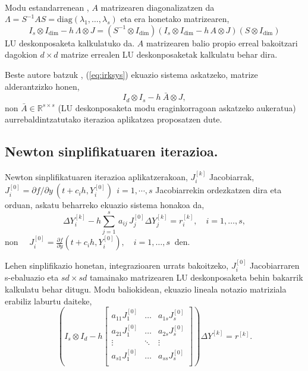 \paragraph*{}Modu estandarrenean  \cite{Butcher1976} \cite{Liniger1970} \cite{Bickart1977} , $A$ matrizearen diagonalizatzen da $\Lambda = S^{-1} A S=\mathrm{diag}(\lambda_1,\ldots,\lambda_s)$ eta era honetako matrizearen,
\begin{equation*}
I_s \otimes I_\dim  - h \, \Lambda \otimes J = (S^{-1} \otimes I_\dim) \left( I_s \otimes I_\dim  - h \, A \otimes J\right) (S \otimes I_\dim)
\end{equation*}
LU deskonposaketa kalkulatuko da. $A$ matrizearen balio propio erreal bakoitzari dagokion $d \times d$ matrize errealen LU deskonposaketak kalkulatu behar dira.

Beste autore batzuk \cite{Brugnano2014} \cite{Jay2009}, (\ref{eq:irksys}) ekuazio sistema askatzeko, matrize alderantzizko honen,
\begin{equation}
I_d \otimes I_s -h \ \bar{A} \otimes J,
\end{equation}
non $\bar{A} \in \mathbb{R}^{s \times s}$ (LU deskonposaketa modu eraginkorragoan askatzeko aukeratua) aurrebaldintzatutako iterazioa aplikatzea proposatzen dute. 


\subsection*{Newton sinplifikatuaren iterazioa.}

Newton sinplifikatuaren iterazioa aplikatzerakoan, $J_i^{[k]}$ Jacobiarrak,  $J_i^{[0]}=\partial f / \partial y \ (t+c_ih, Y_i^{[0]}) \ \ i=1,\cdots,s$ Jacobiarrekin ordezkatzen dira eta orduan, askatu beharreko ekuazio sistema honakoa da,
\begin{equation*}
\Delta Y_{i}^{[k]}  - h \sum_{j=1}^{s}\, a_{ij}\, J_j^{[0]} \Delta Y_{j}^{[k]} = r_i^{[k]}, \quad  i=1 ,\ldots, s,
\end{equation*}
non $\quad  J_i^{[0]}=\frac{\partial f}{\partial y}(t + c_i h,Y_{i}^{[0]}), \quad  i=1,\ldots,s \ $ den.

Lehen sinplifikazio honetan, integrazioaren urrats bakoitzeko,  $J_i^{[0]}$ Jacobiarraren s-ebaluazio eta $sd \times sd$ tamainako matrizearen LU deskonposaketa behin bakarrik kalkulatu behar ditugu. Modu baliokidean, ekuazio lineala notazio matriziala erabiliz laburtu daiteke,
\begin{equation*}
\label{eq:805}
\left (I_s \otimes I_d - h  
\begin{bmatrix}
a_{11}  J_1^{[0]} & \dots & a_{1s}  J_s^{[0]} \\
a_{21}  J_1^{[0]} & \dots & a_{2s}  J_s^{[0]} \\
\vdots            & \ddots & \vdots \\
a_{s1}  J_1^{[0]} & \dots & a_{ss}  J_s^{[0]} \\ 
\end{bmatrix} \right) \Delta Y^{[k]} =r^{[k]}.
\end{equation*}

